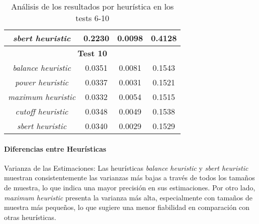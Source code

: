 \documentclass{article}
\begin{document}
\begin{table}[H]
{\begin{tabular}{|c|c|c|c|}
\textit{sbert heuristic} & 0.2230 & 0.0098 & 0.4128 \\ \hline
\multicolumn{4}{|c|}{\textbf{Test 10}} \\ \hline
\textit{balance heuristic} & 0.0351 & 0.0081 & 0.1543 \\ \hline
\textit{power heuristic} & 0.0337 & 0.0031 & 0.1521 \\ \hline
\textit{maximum heuristic} & 0.0332 & 0.0054 & 0.1515 \\ \hline
\textit{cutoff heuristic} & 0.0348 & 0.0049 & 0.1538 \\ \hline
\textit{sbert heuristic} & 0.0340 & 0.0029 & 0.1529 \\ \hline
\end{tabular}%
}
\caption{Análisis de los resultados por heurística en los tests 6-10}
\end{table}

\begin{table}[H]
\centering
\label{table:heuristic_analysis}
\caption{Análisis de los resultados por heurística}
\end{table}


\paragraph{Diferencias entre Heurísticas}
Varianza de las Estimaciones: Las heurísticas \textit{balance heuristic} y \textit{sbert heuristic} muestran consistentemente las varianzas más bajas a través de todos los tamaños de muestra, lo que indica una mayor precisión en sus estimaciones.
Por otro lado, \textit{maximum heuristic} presenta la varianza más alta, especialmente con tamaños de muestra más pequeños, lo que sugiere una menor fiabilidad en comparación con otras heurísticas.
\end{document}
